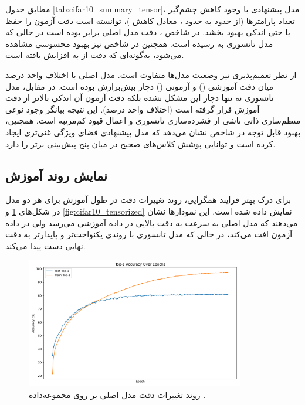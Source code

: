 مطابق جدول \ref{tab:cifar10_summary_tensor}، مدل پیشنهادی با وجود کاهش چشم‌گیر تعداد پارامترها (از حدود  به حدود ، معادل کاهش )، توانسته است دقت آزمون را حفظ یا حتی اندکی بهبود بخشد. در شاخص ، دقت مدل اصلی برابر  بوده است در حالی که مدل تانسوری به  رسیده است. همچنین در شاخص  نیز بهبود محسوسی مشاهده می‌شود، به‌گونه‌ای که دقت از  به  افزایش یافته است.  

از نظر تعمیم‌پذیری نیز وضعیت مدل‌ها متفاوت است. مدل اصلی با اختلاف  واحد درصد میان دقت آموزشی () و آزمونی () دچار بیش‌برازش بوده است. در مقابل، مدل تانسوری نه تنها دچار این مشکل نشده بلکه دقت آزمون آن اندکی بالاتر از دقت آموزش قرار گرفته است (اختلاف  واحد درصد). این نتیجه بیانگر وجود نوعی منظم‌سازی ذاتی ناشی از فشرده‌سازی تانسوری و اعمال قیود کم‌مرتبه است. همچنین، بهبود قابل توجه در شاخص  نشان می‌دهد که مدل پیشنهادی فضای ویژگی غنی‌تری ایجاد کرده است و توانایی پوشش کلاس‌های صحیح در میان پنج پیش‌بینی برتر را دارد.

\subsection{نمایش روند آموزش}

برای درک بهتر فرایند همگرایی، روند تغییرات دقت  در طول آموزش برای هر دو مدل در شکل‌های \ref{fig:cifar10_swin_original} و \ref{fig:cifar10_tensorized} نمایش داده شده است. این نمودارها نشان می‌دهند که مدل اصلی به سرعت به دقت بالایی در داده آموزشی می‌رسد ولی در داده آزمون افت می‌کند، در حالی که مدل تانسوری با روندی یکنواخت‌تر و پایدارتر به دقت نهایی دست پیدا می‌کند.

\begin{figure}[ht]
	\centering
	\includegraphics[width=0.85\textwidth]{transformer_images/results/cifar10_swin_original.png}
	\caption{روند تغییرات دقت  مدل اصلی  بر روی مجموعه‌داده .}
	\label{fig:cifar10_swin_original}
\end{figure}


